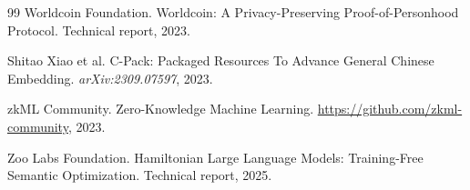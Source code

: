\begin{thebibliography}{99}
Worldcoin Foundation.
\newblock Worldcoin: A Privacy-Preserving Proof-of-Personhood Protocol.
\newblock Technical report, 2023.

Shitao Xiao et al.
\newblock C-Pack: Packaged Resources To Advance General Chinese Embedding.
\newblock \textit{arXiv:2309.07597}, 2023.

zkML Community.
\newblock Zero-Knowledge Machine Learning.
\newblock \url{https://github.com/zkml-community}, 2023.

Zoo Labs Foundation.
\newblock Hamiltonian Large Language Models: Training-Free Semantic Optimization.
\newblock Technical report, 2025.

\end{thebibliography}

\appendix


